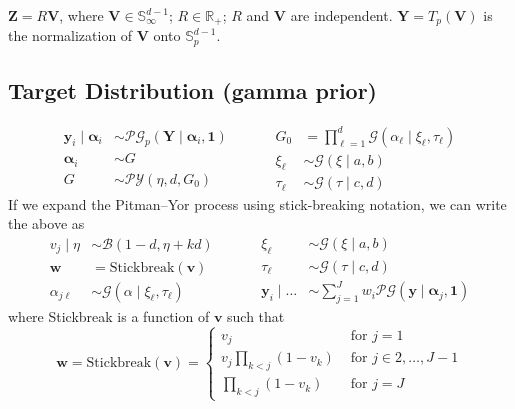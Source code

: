 $\bm{Z} = R\bm{V}$, where $\bm{V} \in \mathbb{S}_{\infty}^{d-1}$; 
$R \in \mathbb{R}_+$; $R$ and $\bm{V}$ are independent.  
$\bm{Y} = T_p(\bm{V})$ is the normalization of $\bm{V}$ onto 
$\mathbb{S}_p^{d-1}$.


\subsection{Target Distribution (gamma prior)}
\begin{equation}
    \begin{aligned}
        \bm{y}_i \mid \bm{\alpha}_i &\sim
        \mathcal{PG}_p\left(\bm{Y}\mid\bm{\alpha}_i,\bm{1}\right)\\
        \bm{\alpha}_i &\sim G\\
        G &\sim \mathcal{PY}\left(\eta, d, G_0\right)        
    \end{aligned}
    ~\hspace{1cm}
    \begin{aligned}
        G_0 &= {\textstyle\prod}_{\ell = 1}^{d}\mathcal{G}(\alpha_{\ell}\mid \xi_{\ell},\tau_{\ell})\\
        \xi_{\ell} &\sim \mathcal{G}(\xi\mid a, b)\\
        \tau_{\ell} &\sim \mathcal{G}(\tau\mid c, d)
    \end{aligned}
\end{equation}
If we expand the Pitman--Yor process using stick-breaking notation, we can write the above as
\begin{equation}
    \begin{aligned}
        v_j\mid\eta &\sim \mathcal{B}(1 - d, \eta + kd)\\
        \bm{w} &= \text{Stickbreak}(\bm{v})\\
        \alpha_{j\ell} &\sim \mathcal{G}(\alpha\mid\xi_{\ell},\tau_{\ell})
    \end{aligned}
    ~\hspace{1cm}
    \begin{aligned}
        \xi_{\ell} &\sim \mathcal{G}(\xi \mid a, b)\\
        \tau_{\ell} &\sim \mathcal{G}(\tau\mid c, d)\\
        \bm{y}_i \mid \ldots &\sim {\textstyle\sum}_{j = 1}^Jw_i\mathcal{PG}(\bm{y}\mid\bm{\alpha}_j, \bm{1})
    \end{aligned}   
\end{equation}
where Stickbreak is a function of $\bm{v}$ such that
\begin{equation*}
    \bm{w} = \text{Stickbreak}(\bm{v}) = \begin{cases}
        v_j &\text{ for }j = 1\\
        v_j{\textstyle\prod}_{k < j}(1 - v_k) &\text{ for }j \in 2,\ldots,J-1\\
        {\textstyle\prod}_{k < j}(1 - v_k) &\text{ for }j = J
    \end{cases}
\end{equation*}

